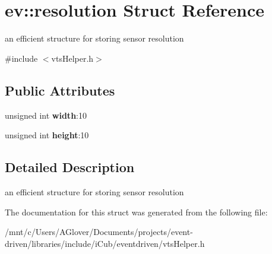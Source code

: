 \hypertarget{structev_1_1resolution}{}\section{ev\+:\+:resolution Struct Reference}
\label{structev_1_1resolution}


an efficient structure for storing sensor resolution  




{\ttfamily \#include $<$vts\+Helper.\+h$>$}

\subsection*{Public Attributes}
\begin{DoxyCompactItemize}
\item 
\mbox{\label{structev_1_1resolution_af63d9f023bf48b5170fbde6fac1fa60d}} 
unsigned int {\bfseries width}\+:10
\item 
\mbox{\label{structev_1_1resolution_ae9919e691ce05e1bbbf281dd79102ddb}} 
unsigned int {\bfseries height}\+:10
\end{DoxyCompactItemize}


\subsection{Detailed Description}
an efficient structure for storing sensor resolution 

The documentation for this struct was generated from the following file\+:\begin{DoxyCompactItemize}
\item 
/mnt/c/\+Users/\+A\+Glover/\+Documents/projects/event-\/driven/libraries/include/i\+Cub/eventdriven/vts\+Helper.\+h\end{DoxyCompactItemize}
